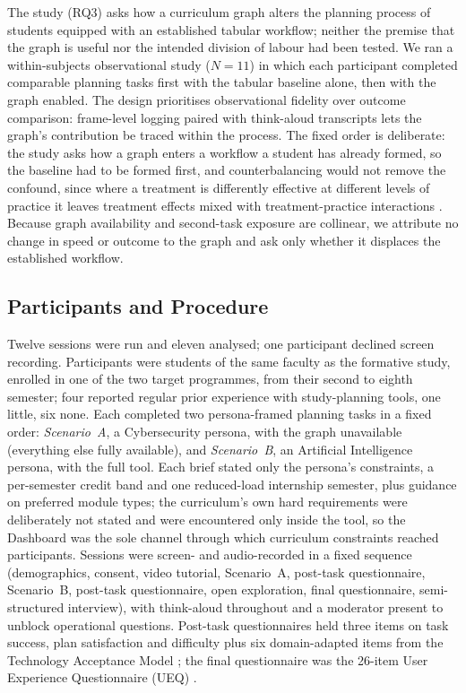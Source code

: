 \documentclass[a4paper,twoside]{article}
\begin{document}
\noindent The study (RQ3) asks how a curriculum graph alters the planning process of students equipped with an established tabular workflow; neither the premise that the graph is useful nor the intended division of labour had been tested. We ran a within-subjects observational study ($N=11$) in which each participant completed comparable planning tasks first with the tabular baseline alone, then with the graph enabled. The design prioritises observational fidelity over outcome comparison: frame-level logging paired with think-aloud transcripts lets the graph's contribution be traced within the process. The fixed order is deliberate: the study asks how a graph enters a workflow a student has already formed, so the baseline had to be formed first, and counterbalancing would not remove the confound, since where a treatment is differently effective at different levels of practice it leaves treatment effects mixed with treatment-practice interactions \cite{greenwald1976within}. Because graph availability and second-task exposure are collinear, we attribute no change in speed or outcome to the graph and ask only whether it displaces the established workflow.

\subsection{Participants and Procedure}

Twelve sessions were run and eleven analysed; one participant declined screen recording. Participants were students of the same faculty as the formative study, enrolled in one of the two target programmes, from their second to eighth semester; four reported regular prior experience with study-planning tools, one little, six none. Each completed two persona-framed planning tasks in a fixed order: \emph{Scenario~A}, a Cybersecurity persona, with the graph unavailable (everything else fully available), and \emph{Scenario~B}, an Artificial Intelligence persona, with the full tool. Each brief stated only the persona's constraints, a per-semester credit band and one reduced-load internship semester, plus guidance on preferred module types; the curriculum's own hard requirements were deliberately not stated and were encountered only inside the tool, so the Dashboard was the sole channel through which curriculum constraints reached participants. Sessions were screen- and audio-recorded in a fixed sequence (demographics, consent, video tutorial, Scenario~A, post-task questionnaire, Scenario~B, post-task questionnaire, open exploration, final questionnaire, semi-structured interview), with think-aloud throughout and a moderator present to unblock operational questions. Post-task questionnaires held three items on task success, plan satisfaction and difficulty plus six domain-adapted items from the Technology Acceptance Model \cite{davis_perceived_1989}; the final questionnaire was the 26-item User Experience Questionnaire (UEQ) \cite{laugwitz_construction_2008}.
\end{document}
